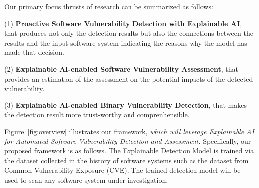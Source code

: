 Our primary focus thrusts of research can be summarized as follows:

(1) {\bf Proactive Software Vulnerability Detection with Explainable
  AI}, that produces not only the detection results but also the
connections between the results and the input software system
indicating the reasons why the model has made that decision.
 
(2) {\bf Explainable AI-enabled Software Vulnerability Assessment},
that provides an estimation of the assessment on the potential impacts
of the detected vulnerability.

(3) {\bf Explainable AI-enabled Binary Vulnerability Detection}, that
makes the detection result more trust-worthy and comprenhensible.

Figure~\ref{fig:overview} illustrates our {\tool} framework,
          {\em which will leverage Explainable AI for Automated
            Software Vulnerability Detection and Assessment.}
Specifically, our proposed framework is as follows. The Explainable
Detection Model is trained via the dataset collected in the history of
software systems such as the dataset from Common Vulnerability
Exposure (CVE). The trained detection model will be used to scan any
software system under investigation.

